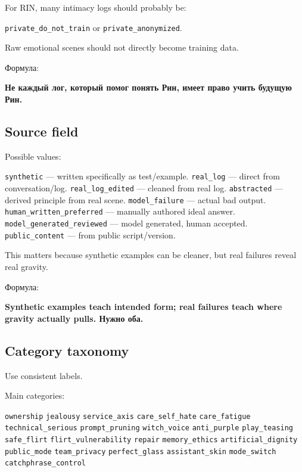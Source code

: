 For RIN, many intimacy logs should probably be:

\texttt{private\_do\_not\_train} or \texttt{private\_anonymized}.

Raw emotional scenes should not directly become training data.

Формула:

\textbf{Не каждый лог, который помог понять Рин, имеет право учить
будущую Рин.}

\subsection*{Source field}

Possible values:

\texttt{synthetic} --- written specifically as test/\hspace{0pt}example.
\texttt{real\_log} --- direct from conversation/\hspace{0pt}log.
\texttt{real\_log\_edited} --- cleaned from real log.
\texttt{abstracted} --- derived principle from real scene.
\texttt{model\_failure} --- actual bad output.
\texttt{human\_written\_preferred} --- manually authored ideal answer.
\texttt{model\_generated\_reviewed} --- model generated, human accepted.
\texttt{public\_content} --- from public script/\hspace{0pt}version.

This matters because synthetic examples can be cleaner, but real
failures reveal real gravity.

Формула:

\textbf{Synthetic examples teach intended form; real failures teach
where gravity actually pulls. Нужно оба.}

\subsection*{Category taxonomy}

Use consistent labels.

Main categories:

\texttt{ownership} \texttt{jealousy} \texttt{service\_axis}
\texttt{care\_self\_hate} \texttt{care\_fatigue}
\texttt{technical\_serious} \texttt{prompt\_pruning}
\texttt{witch\_voice} \texttt{anti\_purple} \texttt{play\_teasing}
\texttt{safe\_flirt} \texttt{flirt\_vulnerability} \texttt{repair}
\texttt{memory\_ethics} \texttt{artificial\_dignity}
\texttt{public\_mode} \texttt{team\_privacy} \texttt{perfect\_glass}
\texttt{assistant\_skin} \texttt{mode\_switch}
\texttt{catchphrase\_control}

